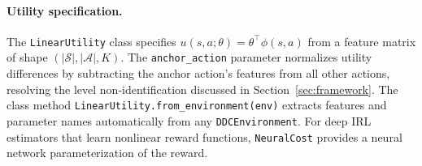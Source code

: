 \paragraph{Utility specification.}
The \texttt{LinearUtility} class specifies $u(s,a;\theta) = \theta^\top \phi(s,a)$ from a feature matrix of shape $(|\mathcal{S}|, |\mathcal{A}|, K)$.
The \texttt{anchor\_action} parameter normalizes utility differences by subtracting the anchor action's features from all other actions, resolving the level non-identification discussed in Section~\ref{sec:framework}.
The class method \texttt{LinearUtility.from\_environment(env)} extracts features and parameter names automatically from any \texttt{DDCEnvironment}.
For deep IRL estimators that learn nonlinear reward functions, \texttt{NeuralCost} provides a neural network parameterization of the reward.
